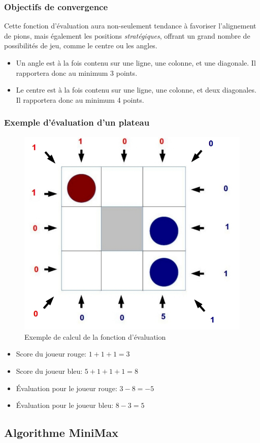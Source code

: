 \documentclass[a4paper,12pt]{article}
\begin{document}
\subsubsection{Objectifs de convergence}
Cette fonction d'évaluation aura non-seulement tendance à favoriser l'alignement de pions, mais également les positions \emph{stratégiques}, offrant un grand nombre de possibilités de jeu, comme le centre ou les angles.
\begin{itemize}
	\item Un angle est à la fois contenu sur une ligne, une colonne, et une diagonale. Il rapportera donc au minimum 3 points.
	\item Le centre est à la fois contenu sur une ligne, une colonne, et deux diagonales. Il rapportera donc au minimum 4 points.
\end{itemize}

\subsubsection{Exemple d'évaluation d'un plateau}
\begin{figure}[h!]
    \centering
    \includegraphics[width=.6\textwidth]{./pix/evaluation.jpg}
    \caption{Exemple de calcul de la fonction d'évaluation}
\end{figure}
\begin{itemize}
	\item Score du joueur rouge: $1 + 1 + 1 = 3$
	\item Score du joueur bleu: $5 + 1 + 1 + 1 = 8$
	\item Évaluation pour le joueur rouge: $3 - 8 = -5$
	\item Évaluation pour le joueur bleu: $8 - 3 = 5$
\end{itemize}


\subsection{Algorithme MiniMax}
\end{document}
